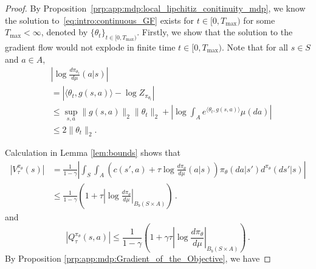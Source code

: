 \documentclass{amsart}
\theoremstyle{definition}
\begin{document}
\begin{proof}

By Proposition~\ref{prp:app:mdp:local_lipchitiz_conitinuity_mdp}, we know the solution to~\eqref{eq:intro:continuous_GF} exists for $t \in [0, T_{\max})$  for some $T_{\max} < \infty$, denoted by $\{\theta_t\}_{t \in [0, T_{\max})}$.
Firstly, we show that the solution to the gradient flow would not explode in finite time $t \in [0, T_{\max})$. Note that for all $s \in S$ and $a \in A$,
\begin{align}
&\left|\log\frac{d \pi_{\theta_t}}{d \mu}(a|s)\right| \nonumber\\
& = \left| \langle \theta_t, g(s,a)\rangle - \log Z_{\pi_{\theta_t}} \right| \nonumber\\
& \leq \sup_{s,a}\|g(s,a)\|_2\|\theta_t\|_2 + \left|\log \int_A e^{\langle \theta_t,g(s,a)\rangle}\mu(da)\right| \nonumber\\
& \leq 2  \|\theta_t\|_2 \label{eq:log_density_bound_*}.
\end{align}

Calculation in Lemma \ref{lem:bounds} shows that
\begin{align*}
|V^{\pi_\theta}_{\tau}(s)|&=\frac{1}{1-\gamma}\left|\int_{S}\int_A \left(c(s',a)+\tau \log \frac{d\pi_{\theta}}{d\mu}(a|s)\right)\pi_{\theta}(da|s')d^{\pi_\theta}(ds'|s)\right|\\
&\le \frac{1}{1-\gamma} \left(1+\tau \left|\log \frac{d\pi_{\theta}}{d\mu}\right|_{B_b(S \times A)}\right)\,.
\end{align*}
and
\begin{equation}\label{eq:Qpi_bound_*}
|Q^{\pi_{\theta}}_{\tau}(s,a)| \le \frac{1}{1-\gamma} \left(1+\gamma\tau  \left|\log \frac{d\pi_{\theta}}{d\mu}\right|_{B_b(S \times A)}\right)\,.
\end{equation}
By Proposition \ref{prp:app:mdp:Gradient_of_the_Objective}, we have


\end{proof}
\end{document}
